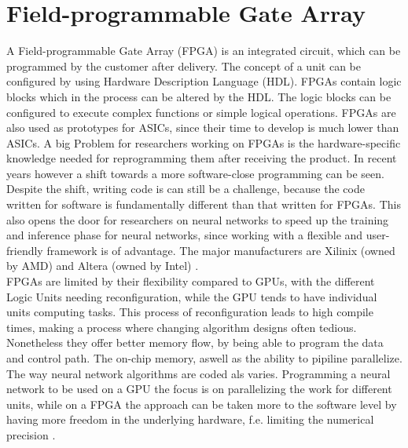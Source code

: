 \documentclass[conference]{IEEEtran}
\begin{document}
\section{Field-programmable Gate Array}
A Field-programmable Gate Array (FPGA) is an integrated circuit, which can be programmed by the customer after delivery. The concept of a unit can be configured by using Hardware Description Language (HDL). FPGAs contain logic blocks which in the process can be altered by the HDL. The logic blocks can be configured to execute complex functions or simple logical operations. FPGAs are also used as prototypes for ASICs, since their time to develop is much lower than ASICs. A big Problem for researchers working on FPGAs is the hardware-specific knowledge needed for reprogramming them after receiving the product. In recent years however a shift towards a more software-close programming can be seen. Despite the shift, writing code is can still be a challenge, because the code written for software is fundamentally different than that written for FPGAs. This also opens the door for researchers on neural networks to speed up the training and inference phase for neural networks, since working with a flexible and user-friendly framework is of advantage. The major manufacturers are Xilinix (owned by AMD) and Altera (owned by Intel) \cite{majorfpga}.
\\
FPGAs are limited by their flexibility compared to GPUs, with the different Logic Units needing reconfiguration, while the GPU tends to have individual units computing tasks. This process of reconfiguration leads to high compile times, making a process where changing algorithm designs often tedious. Nonetheless they offer better memory flow, by being able to program the data and control path. The on-chip memory, aswell as the ability to pipiline parallelize. The way neural network algorithms are coded als varies. Programming a neural network to be used on a GPU the focus is on parallelizing the work for different units, while on a FPGA the approach can be taken more to the software level by having more freedom in the underlying hardware, f.e. limiting the numerical precision \cite{gupta2015deep}.
\\
\end{document}
